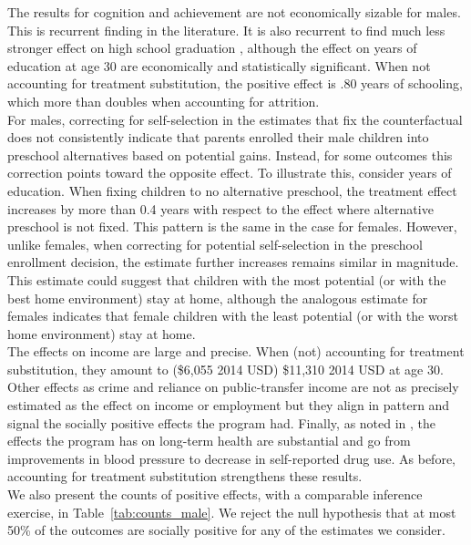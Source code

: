 \noindent The results for cognition and achievement are not economically sizable for males. This is recurrent finding in the literature. It is also recurrent to find much less stronger effect on high school graduation \citep{Elango_Hojman_etal_2016_Early-Edu}, although the effect on years of education at age 30 are economically and statistically significant. When not accounting for treatment substitution, the positive effect is .80 years of schooling, which more than doubles when accounting for attrition.\\

\noindent For males, correcting for self-selection in the estimates that fix the counterfactual does not consistently indicate that parents enrolled their male children into preschool alternatives based on potential gains. Instead, for some outcomes this correction points toward the opposite effect. To illustrate this, consider years of education. When fixing children to no alternative preschool, the treatment effect increases by more than 0.4 years with respect to the effect where alternative preschool is not fixed. This pattern is the same in the case for females. However, unlike females, when correcting for potential self-selection in the preschool enrollment decision, the estimate further increases remains similar in magnitude. This estimate could suggest that children with the most potential (or with the best home environment) stay at home, although the analogous estimate for females indicates that female children with the least potential (or with the worst home environment) stay at home.\\

\noindent The effects on income are large and precise. When (not) accounting for treatment substitution, they amount to (\$6,055 2014 USD) \$11,310 2014 USD at age 30. Other effects as crime and reliance on public-transfer income are not as precisely estimated as the effect on income or employment but they align in pattern and signal the socially positive effects the program had. Finally, as noted in \citet{Campbell_Conti_etal_2014_EarlyChildhoodInvestments}, the effects the program has on long-term health are substantial and go from improvements in blood pressure to decrease in self-reported drug use. As before, accounting for treatment substitution strengthens these results.\\

\noindent We also present the counts of positive effects, with a comparable inference exercise, in Table~\ref{tab:counts_male}. We reject the null hypothesis that at most 50\% of the outcomes are socially positive for any of the estimates we consider.


